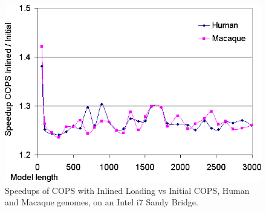 \begin{figure}[H]
	\centering
	\includegraphics[scale=0.48]{graphics/inlined-cmp-aleph.png}
	\caption[Speedups of Inlined COPS vs Initial COPS on an Intel i7 Sandy Bridge] 
	{Speedups of COPS with Inlined Loading vs Initial COPS, Human and Macaque genomes, on an Intel i7 Sandy Bridge.}
	\label{inlined-cmp-aleph}
\end{figure} 

